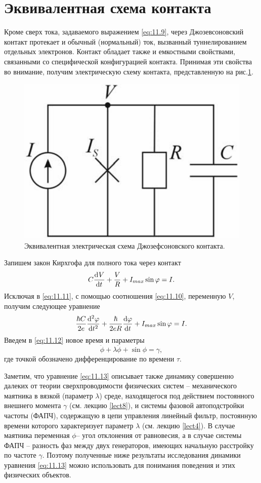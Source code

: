 \section{Эквивалентная схема контакта}%
\label{sec:11.2}

Кроме сверх тока, задаваемого выражением \eqref{eq:11.9}, через Джозевсоновский контакт протекает и обычный (нормальный) ток, вызванный туннелированием отдельных электронов. Контакт обладает также 
и емкостными свойствами, связанными со специфической конфигурацией контакта. Принимая эти
свойства во внимание, получим электрическую схему контакта, представленную на рис.\ref{fig:11.1}.
\begin{figure}[h]
        \centering
        \includegraphics[width=0.4\linewidth]{fig/lect11/1}
        \caption{Эквивалентная электрическая схема Джозефсоновского контакта.}
        \label{fig:11.1}
\end{figure}
Запишем закон Кирхгофа для полного тока через контакт
\begin{equation}
        \label{eq:11.11}
        C \dv[]{V}{t} + \frac{V}{R } + I_{max} \sin \varphi = I.
\end{equation}
Исключая в \eqref{eq:11.11}, с помощью соотношения \eqref{eq:11.10}, переменную $V$, получим
следующее уравнение
\begin{equation}
        \label{eq:11.12}
        \frac{\hbar C}{2e} \dv[2]{\varphi}{t} + \frac{\hbar}{2eR}\dv{\varphi}{t}+I_{max}\sin \varphi =I.
\end{equation}
Введем в \eqref{eq:11.12} новое время и параметры
\begin{equation}
        \label{eq:11.13}
        \ddot \phi + \lambda \ddot \phi + \sin \phi = \gamma,
\end{equation}
где точкой обозначено дифференцирование по времени $\tau$.

Заметим, что уравнение \eqref{eq:11.13} описывает также динамику совершенно далеких от теории
сверхпроводимости физических систем -- механического маятника в вязкой (параметр $\lambda$) среде, 
находящегося под действием постоянного внешнего момента $\gamma$ (см. лекцию \ref{lect8}),  
и системы фазовой автоподстройки частоты (ФАПЧ), содержащую в цепи управления линейный фильтр, постоянную времени которого характеризует параметр $\lambda$ (см. лекцию \ref{lect4}).
В случае маятника переменная $\phi$-- угол отклонения от равновесия, а в случае системы ФАПЧ -- 
разность фаз между двух генераторов, имеющих начальную расстройку по частоте $\gamma$. Поэтому 
полученные ниже результаты исследования динамики уравнения \eqref{eq:11.13} можно использовать для понимания поведения и этих физических объектов. 


